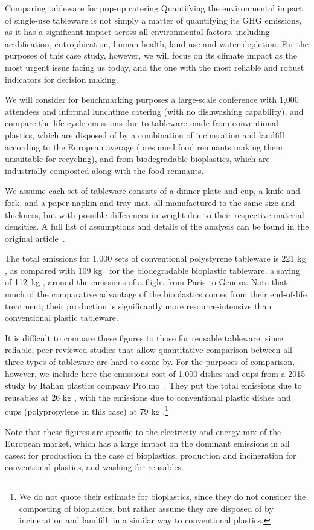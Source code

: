 \documentclass[../SustainableHEP.tex]{subfiles}
\begin{document}
\begin{casestudy}{Comparing tableware for pop-up catering}%
\noindent Quantifying the environmental impact of single-use tableware is not simply a matter of quantifying its GHG emissions, as it has a significant impact across all environmental factors, including acidification, eutrophication, human health, land use and water depletion.  For the purposes of this case study, however, we will focus on its climate impact as the most urgent issue facing us today, and the one with the most reliable and robust indicators for decision making.

    We will consider for benchmarking purposes a large-scale conference with 1,000 attendees and informal lunchtime catering (\ie with no dishwashing capability), and compare the life-cycle emissions due to tableware made from conventional plastics, which are disposed of by a combination of incineration and landfill according to the European average (presumed food remnants making them unsuitable for recycling), and from biodegradable bioplastics, which are industrially composted along with the food remnants.

    We assume each set of tableware consists of a dinner plate and cup, a knife and fork, and a paper napkin and tray mat, all manufactured to the same size and thickness, but with possible differences in weight due to their respective material densities.  A full list of assumptions and details of the analysis can be found in the original article~\cite{Fieschi2018}.   

    The total emissions for 1,000 sets of conventional polystyrene tableware is 221 kg \CdOe, as compared with 109 kg \CdOe\ for the biodegradable bioplastic tableware, a saving of 112~kg \CdOe, around the emissions of a flight from Paris to Geneva.  Note that much of the comparative advantage of the bioplastics comes from their end-of-life treatment; their production is significantly more resource-intensive than conventional plastic tableware.  

    It is difficult to compare these figures to those for reusable tableware, since reliable, peer-reviewed studies that allow quantitative comparison between all three types of tableware are hard to come by.  For the purposes of comparison, however, we include here the emissions cost of 1,000 dishes and cups from a 2015 study by Italian plastics company Pro.mo~\cite{PROMO2015}.  They put the total emissions due to reusables at 26 kg \CdOe, with the emissions due to conventional plastic dishes and cups (polypropylene in this case) at 79 kg \CdOe.\footnote{We do not quote their estimate for bioplastics, since they do not consider the composting of bioplastics, but rather assume they are disposed of by incineration and landfill, in a similar way to conventional plastics.}

    Note that these figures are specific to the electricity and energy mix of the European market, which has a large impact on the dominant emissions in all cases: for production in the case of bioplastics, production and incineration for conventional plastics, and washing for reusables. 

\end{casestudy}
\end{document}
